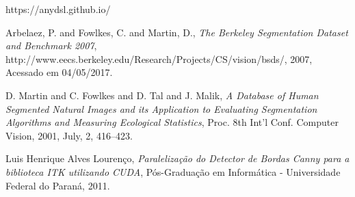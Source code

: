 \documentclass{article}
\begin{document}
\begin{thebibliography}{4}

  https://anydsl.github.io/

   Arbelaez, P. and Fowlkes, C. and Martin, D.,
   \textit{The Berkeley Segmentation Dataset and Benchmark 2007},
   http://www.eecs.berkeley.edu/Research/Projects/CS/vision/bsds/,
   2007,
   Acessado em 04/05/2017.

  D. Martin and C. Fowlkes and D. Tal and J. Malik,
  \textit{A Database of Human Segmented Natural Images and its 
           Application to Evaluating Segmentation Algorithms and 
           Measuring Ecological Statistics},
  Proc. 8th Int'l Conf. Computer Vision,
  2001,
  July,
  2,
  416--423.

   Luis Henrique Alves Lourenço,
   \textit{Paralelização do Detector de Bordas Canny para a biblioteca ITK utilizando CUDA},
   Pós-Graduação em Informática - Universidade Federal do Paraná, 
   2011.

\end{thebibliography}
\end{document}
